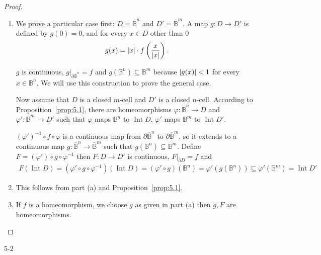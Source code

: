 \begin{proof}
	\begin{enumerate}[label={(\alph*)}]
		\item We prove a particular case first: $D = \overline{\mathbb{B}}^{n}$ and $D' = \overline{\mathbb{B}}^{m}$. A map $g: D\to D'$ is defined by $g(0) = 0$, and for every $x \in D$ other than 0
		      \begin{align*}
			      g(x) = \left\vert{x}\right\vert\cdot f\left(\frac{x}{\left\vert{x}\right\vert}\right).
		      \end{align*}

		      $g$ is continuous, $g\vert_{\partial \overline{\mathbb{B}}^{n}} = f$ and $g(\mathbb{B}^{n}) \subseteq \mathbb{B}^{m}$ because $\left\vert{g(x)}\right\vert < 1$ for every $x \in \mathbb{B}^{n}$. We will use this construction to prove the general case.

		      Now assume that $D$ is a closed $m$-cell and $D'$ is a closed $n$-cell. According to Proposition~\ref{prop:5.1}, there are homeomorphisms $\varphi: \overline{\mathbb{B}}^{n} \to D$ and $\varphi': \overline{\mathbb{B}}^{m} \to D'$ such that $\varphi$ maps $\mathbb{B}^{n}$ to $\operatorname{Int} D$, $\varphi'$ maps $\mathbb{B}^{m}$ to $\operatorname{Int} D'$.

		      ${(\varphi')}^{-1}\circ f\circ \varphi$ is a continuous map from $\partial \overline{\mathbb{B}}^{n}$ to $\partial \overline{\mathbb{B}}^{m}$, so it extends to a continuous map $g: \overline{\mathbb{B}}^{n} \to \overline{\mathbb{B}}^{m}$ such that $g(\mathbb{B}^{n}) \subseteq \mathbb{B}^{m}$. Define $F = {(\varphi')}\circ g\circ \varphi^{-1}$ then $F: D \to D'$ is continuous, $F\vert_{\partial D} = f$ and
		      \begin{align*}
			      F(\operatorname{Int} D) = (\varphi'\circ g\circ \varphi^{-1})(\operatorname{Int} D) = {(\varphi' \circ g)}(\mathbb{B}^{n}) = \varphi'(g(\mathbb{B}^{n})) \subseteq \varphi'(\mathbb{B}^{m}) = \operatorname{Int} D'
		      \end{align*}
		\item This follows from part (a) and Proposition~\ref{prop:5.1}.
		\item If $f$ is a homeomorphism, we choose $g$ as given in part (a) then $g, F$ are homeomorphisms.
	\end{enumerate}
\end{proof}

\begin{problem}{5-2}\label{problem:5-2}
\end{problem}

